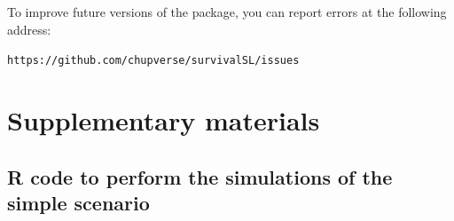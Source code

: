 To improve future versions of the package, you can report errors at the following address:

\texttt{https://github.com/chupverse/survivalSL/issues}

\newpage

\hypertarget{supplementary-materials}{%
\section{Supplementary materials}\label{supplementary-materials}}

\hypertarget{r-code-to-perform-the-simulations-of-the-simple-scenario}{%
\subsection{R code to perform the simulations of the simple scenario}\label{r-code-to-perform-the-simulations-of-the-simple-scenario}}

